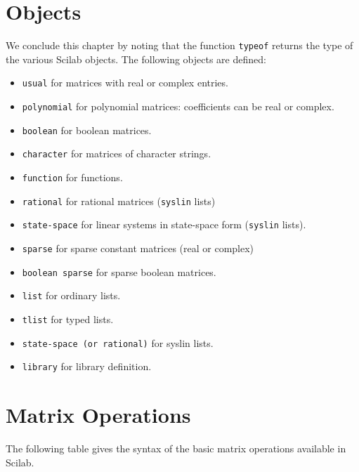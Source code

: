 \section{Objects}
We conclude this chapter by noting that the function {\tt typeof}
returns the type of the various Scilab objects. The following objects
are defined:
\begin{itemize}
\item{\tt usual} 	for matrices with real or complex entries.
\item{\tt polynomial} 	for polynomial matrices: coefficients can be 
real or complex.
\item{\tt boolean} 	for boolean matrices.
\item{\tt character} 	for matrices of character strings.
\item{\tt function} 	for functions.
\item{\tt rational} 	for rational matrices ({\tt syslin} lists)
\item{\tt state-space} 	for linear systems in state-space 
form ({\tt syslin} lists).
\item{\tt sparse} 	for sparse constant matrices (real or complex)
\item{\tt boolean sparse} for sparse boolean matrices.
\item{\tt list} 	for ordinary lists.
\item{\tt tlist}        for typed lists.
\item{\tt state-space (or rational)} for syslin lists.
\item{\tt library} 	for library definition.
\end{itemize}


\section{Matrix Operations}
The following table gives the syntax of the basic matrix operations
available in Scilab.

